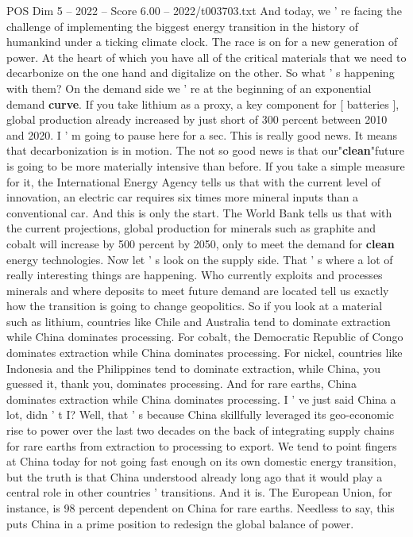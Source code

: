 \begin{textsample}{POS Dim 5 – 2022 – Score 6.00 – 2022/t003703.txt}
And today, we ' re facing the challenge of implementing the biggest energy transition in the history of humankind under a ticking climate clock.
The race is on for a new generation of power.
At the heart of which you have all of the critical materials that we need to decarbonize on the one hand and digitalize on the other.
So what ' s happening with them?
On the demand side we ' re at the beginning of an exponential demand \textbf{curve}.
If you take lithium as a proxy, a key component for [ batteries ], global production already increased by just short of 300 percent between 2010 and 2020.
I ' m going to pause here for a sec.
This is really good news.
It means that decarbonization is in motion.
The not so good news is that our"\textbf{clean}"future is going to be more materially intensive than before.
If you take a simple measure for it, the International Energy Agency tells us that with the current level of innovation, an electric car requires six times more mineral inputs than a conventional car.
And this is only the start.
The World Bank tells us that with the current projections, global production for minerals such as graphite and cobalt will increase by 500 percent by 2050, only to meet the demand for \textbf{clean} energy technologies.
Now let ' s look on the supply side.
That ' s where a lot of really interesting things are happening.
Who currently exploits and processes minerals and where deposits to meet future demand are located tell us exactly how the transition is going to change geopolitics.
So if you look at a material such as lithium, countries like Chile and Australia tend to dominate extraction while China dominates processing.
For cobalt, the Democratic Republic of Congo dominates extraction while China dominates processing.
For nickel, countries like Indonesia and the Philippines tend to dominate extraction, while China, you guessed it, thank you, dominates processing.
And for rare earths, China dominates extraction while China dominates processing.
I ' ve just said China a lot, didn ' t I?
Well, that ' s because China skillfully leveraged its geo-economic rise to power over the last two decades on the back of integrating supply chains for rare earths from extraction to processing to export.
We tend to point fingers at China today for not going fast enough on its own domestic energy transition, but the truth is that China understood already long ago that it would play a central role in other countries ' transitions.
And it is.
The European Union, for instance, is 98 percent dependent on China for rare earths.
Needless to say, this puts China in a prime position to redesign the global balance of power.

\end{textsample}
